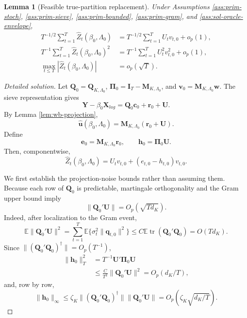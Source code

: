 \documentclass[12pt]{article}
\numberwithin{equation}{section}
\newtheorem{lemma}{Lemma}
\theoremstyle{definition}
\newcommand{\E}{\mathbb E}
\begin{document}
\begin{lemma}[Feasible true-partition replacement]
\label{lem:wb-feasible-replacement}
Under Assumptions \ref{ass:prim-stoch}, \ref{ass:prim-sieve},
\ref{ass:prim-bounded}, \ref{ass:prim-gram}, and
\ref{ass:sol-oracle-envelope},
\begin{align}
    T^{-1/2}\sum_{t=1}^T\widehat Z_t(\beta_0,\Lambda_0)
    &=
    T^{-1/2}\sum_{t=1}^TU_tv_{t,0}+o_p(1),
    \\
    T^{-1}\sum_{t=1}^T\widehat Z_t(\beta_0,\Lambda_0)^2
    &=
    T^{-1}\sum_{t=1}^TU_t^2v_{t,0}^2+o_p(1),
    \\
    \max_{t\leq T}|\widehat Z_t(\beta_0,\Lambda_0)|
    &=o_p(\sqrt T).
\end{align}
\end{lemma}


\begin{proof}[Detailed solution]
Let \(\bm Q_0=\bm Q_{K,\Lambda_0}\),
\(\bm\Pi_0=\bm I_T-\bm M_{K,\Lambda_0}\), and
\(\bm v_0=\bm M_{K,\Lambda_0}\bm w\).  The sieve representation gives
\[
    \bm Y-\beta_0\bm X_{lag}
    =\bm Q_0\bm c_0+\bm r_0+\bm U.
\]
By Lemma \ref{lem:wb-projection},
\[
    \widehat{\bm u}(\beta_0,\Lambda_0)
    =\bm M_{K,\Lambda_0}(\bm r_0+\bm U).
\]
Define
\[
    \bm e_0=\bm M_{K,\Lambda_0}\bm r_0,
    \qquad
    \bm h_0=\bm\Pi_0\bm U.
\]
Then, componentwise,
\begin{equation}
    \widehat Z_t(\beta_0,\Lambda_0)
    =U_tv_{t,0}+(e_{t,0}-h_{t,0})v_{t,0}.
    \label{eq:sol-feasible-score-decomp}
\end{equation}

We first establish the projection-noise bounds rather than assuming them.
Because each row of \(\bm Q_0\) is predictable, martingale orthogonality and
the Gram upper bound imply
\[
    \|\bm Q_0'\bm U\|=O_p(\sqrt{Td_K}).
\]
Indeed, after localization to the Gram event,
\[
    \E\|\bm Q_0'\bm U\|^2
    =\sum_{t=1}^T\E\{\sigma_t^2\|\bm q_{t,0}\|^2\}
    \leq C\E\operatorname{tr}(\bm Q_0'\bm Q_0)
    =O(Td_K).
\]
Since \(\|(\bm Q_0'\bm Q_0)^\dagger\|=O_p(T^{-1})\),
\begin{align*}
    \|\bm h_0\|_T^2
    &=T^{-1}\bm U'\bm\Pi_0\bm U\\
    &\leq
      \frac{C}{T^2}\|\bm Q_0'\bm U\|^2
      =O_p(d_K/T),
\end{align*}
and, row by row,
\[
    \|\bm h_0\|_\infty
    \leq
    \zeta_K\|(\bm Q_0'\bm Q_0)^\dagger\|
             \|\bm Q_0'\bm U\|
    =O_p\left(\zeta_K\sqrt{d_K/T}\right).
\]


\end{proof}
\end{document}

